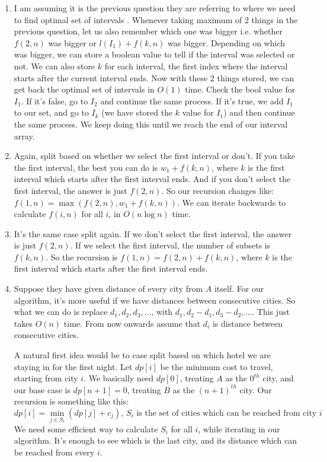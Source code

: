 \documentclass[12pt]{report}
\begin{document}
\begin{enumerate}[label=\textbf{\arabic*.}]
  \item I am assuming it is the previous question they are referring to where we need to find optimal set of intervals . Whenever taking maximum of 2 things in the 
  previous question, let us also remember which one was bigger i.e. whether $f(2,n)$ was bigger or $l(I_1) + f(k,n)$ was bigger. Depending on which was bigger, we can store a boolean value to tell if 
  the interval was selected or not. We can also store $k$ for each interval, the first index where the interval starts after the current interval ends. Now with these 2 things stored, we can get back 
  the optimal set of intervals in $O(1)$ time. Check the bool value for $I_1$. If it's false, go to $I_2$ and continue the same process. If it's true, we add $I_1$ to our set, and go to $I_k$ (we have
  stored the $k$ value for $I_1$) and then continue the same process. We keep doing this until we reach the end of our interval array.
  
  \item Again, split based on whether we select the first interval or don't. If you take the first interval, the best you can do is $w_1 + f(k,n)$, where $k$ is the first interval which starts after
  the first interval ends. And if you don't select the first interval, the answer is just $f(2,n)$. So our recursion changes like: $f(1,n) = \max(f(2, n), w_1 + f(k,n))$. We can iterate backwards 
  to calculate $f(i,n)$ for all $i$, in $O(n \log n)$ time.

  \item It's the same case split again. If we don't select the first interval, the answer is just $f(2,n)$. If we select the first interval, the number of subsets is $f(k,n)$. So the recursion is
  $f(1,n) = f(2,n) + f(k,n)$, where $k$ is the first interval which starts after the first interval ends. 

  \item Suppose they have given distance of every city from $A$ itself. For our algorithm, it's more useful if we have distances between consecutive cities. So what we can do is replace $d_1, d_2, 
  d_3, \dots$, with $d_1, d_2 - d_1, d_3 - d_2, \dots$. This just takes $O(n)$ time. From now onwards assume that $d_i$ is distance between consecutive cities.
  
  A natural first idea would be to case split based on which hotel we are staying in for the first night. Let $dp[i]$ be the minimum cost to travel, starting from city $i$. We basically need
  $dp[0]$, treating $A$ as the $0^{th}$ city, and our base case is $dp[n+1] = 0$, treating $B$ as the $(n+1)^{th}$ city. Our recursion is something like this:
  \[ dp[i] = \min_{j \in S_i} (dp[j] + c_j) \text{, $S_i$ is the set of cities which can be reached from city $i$ } \]
  We need some efficient way to calculate $S_i$ for all $i$, while iterating in our algorithm. It's enough to see which is the last city, and its distance which can be reached from every $i$.
  

\end{enumerate}
\end{document}
